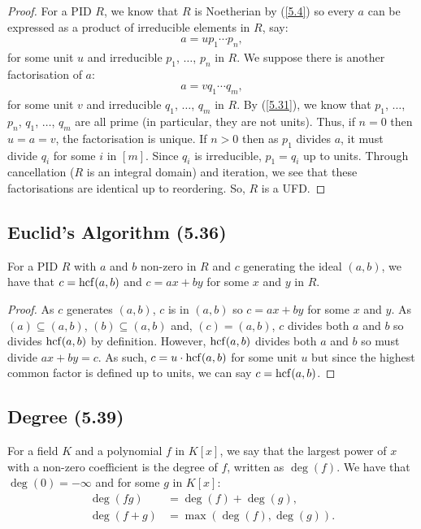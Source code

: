 \begin{proof}
    For a PID $R$, we know that $R$ is Noetherian by (\ref{5.4}) 
    so every $a$ can be expressed as a product of irreducible elements 
    in $R$, say: \begin{align*}
        a = up_1\cdots p_n,
    \end{align*} for some unit $u$ and irreducible $p_1$, $\ldots$, $p_n$
    in $R$. We suppose there is another factorisation of $a$: \begin{align*}
        a = vq_1\cdots q_m,
    \end{align*} for some unit $v$ and irreducible $q_1$, $\ldots$, $q_m$
    in $R$. By (\ref{5.31}), we know that 
    $p_1$, $\ldots$, $p_n$, $q_1$, $\ldots$, $q_m$ are all prime
    (in particular, they are not units). Thus, if $n = 0$ then
    $u = a = v$, the factorisation is unique. If $n > 0$ then
    as $p_1$ divides $a$, it must divide $q_i$ for some $i$ in $[m]$.
    Since $q_i$ is irreducible, $p_1 = q_i$ up to units. Through
    cancellation ($R$ is an integral domain) and iteration, we see
    that these factorisations are identical up to reordering.
    So, $R$ is a UFD.
\end{proof}

\subsection{Euclid's Algorithm (5.36)} \label{5.36}

For a PID $R$ with $a$ and $b$ non-zero in $R$ and $c$ generating the ideal
$(a, b)$, we have that $c = \operatorname{hcf}(a, b)$ and $c = ax+by$ for some $x$ and
$y$ in $R$.

\begin{proof}
    As $c$ generates $(a, b)$, $c$ is in $(a, b)$ so $c = ax + by$ for
    some $x$ and $y$. As $(a) \subseteq (a, b)$, $(b) \subseteq (a, b)$
    and, $(c) = (a, b)$, $c$ divides both $a$ and $b$ so divides
    $\operatorname{hcf}(a, b)$ by definition. However, $\operatorname{hcf}(a, b)$ divides both $a$ and
    $b$ so must divide $ax + by = c$. As such, $c = u\cdot\operatorname{hcf}(a, b)$
    for some unit $u$ but since the highest common factor is defined
    up to units, we can say $c = \operatorname{hcf}(a, b)$.
\end{proof}

\subsection{Degree (5.39)} \label{5.39}

For a field $K$ and a polynomial $f$ in $K[x]$, we say that the largest
power of $x$ with a non-zero coefficient is the degree of $f$,
written as $\deg(f)$. We have that $\deg(0) = -\infty$ and
for some $g$ in $K[x]$: \begin{align*}
    \deg(fg) &= \deg(f) + \deg(g), \\
    \deg(f + g) &= \max(\deg(f), \deg(g)).
\end{align*}

